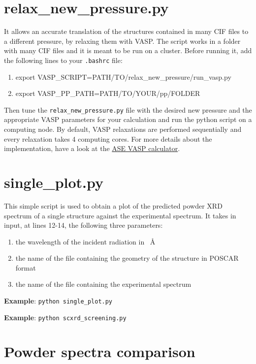 \documentclass{article}
\begin{document}
\section{relax\_new\_pressure.py}
It allows an accurate translation of the structures contained in many CIF files to a different pressure, by relaxing them with VASP. The script works in a folder with many CIF files and it is meant to be run on a cluster. Before running it, add the following lines to your \texttt{.bashrc} file:
\begin{enumerate}
	\item export VASP\_SCRIPT=PATH/TO/relax\_new\_pressure/run\_vasp.py
	\item export VASP\_PP\_PATH=PATH/TO/YOUR/pp/FOLDER
\end{enumerate}
Then tune the \texttt{relax\_new\_pressure.py} file with the desired new pressure and the appropriate VASP parameters for your calculation and run the python script on a computing node. By default, VASP relaxations are performed sequentially and every relaxation takes 4 computing cores. For more details about the implementation, have a look at the \href{https://wiki.fysik.dtu.dk/ase/ase/calculators/vasp.html}{ASE VASP calculator}.

\section{single\_plot.py}
This simple script is used to obtain a plot of the predicted powder XRD spectrum of a single structure against the experimental spectrum. It takes in input, at lines 12-14, the following three parameters:
\begin{enumerate}
	\item the wavelength of the incident radiation in \SI{}{\angstrom}
	\item the name of the file containing the geometry of the structure in POSCAR format
	\item the name of the file containing the experimental spectrum
\end{enumerate}
\textbf{Example}: \texttt{python single\_plot.py}

\vspace{0.2cm}
\noindent \textbf{Example}: \texttt{python scxrd\_screening.py}

\newpage
\appendix
\appendixpage

\section{Powder spectra comparison}
\label{sec:powderspectracomp}
\end{document}
